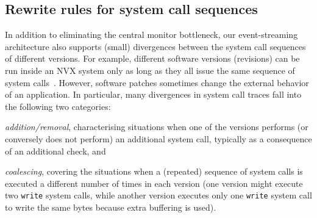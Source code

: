 



\subsection{Rewrite rules for system call sequences}
\label{sec:rw}

In addition to eliminating the central monitor bottleneck, our
event-streaming architecture also supports (small) divergences between
the system call sequences of different versions.  For example,
different software versions (revisions) can be run inside an NVX
system only as long as they all issue the same sequence of system
calls~\cite{mx}.  However, software patches sometimes change the
external behavior of an application.  In particular, many divergences
in system call traces fall into the following two categories:
\begin{inparaenum}[(i)]
\item \emph{addition/removal}, characterising situations when one of
  the versions performs (or conversely does not perform) an additional
  system call, typically as a consequence of an additional check, and
\item \emph{coalescing}, covering the situations when a (repeated)
  sequence of system calls is executed a different number of times in
  each version (\eg one version might execute two \lstinline`write`
  system calls, while another version executes only one
  \lstinline`write` system call to write the same bytes because extra
  buffering is used).

\end{inparaenum}

